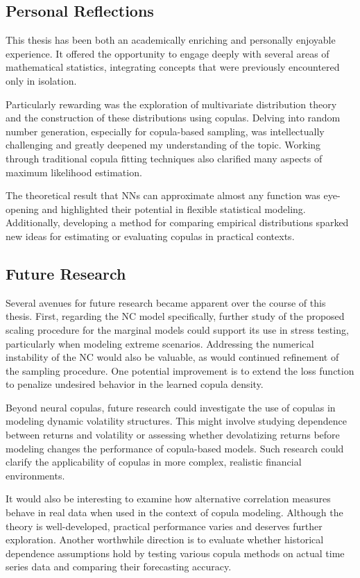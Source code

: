 \subsection{Personal Reflections}
This thesis has been both an academically enriching and personally enjoyable experience. It offered the opportunity to engage deeply with several areas of mathematical statistics, integrating concepts that were previously encountered only in isolation.

Particularly rewarding was the exploration of multivariate distribution theory and the construction of these distributions using copulas. Delving into random number generation, especially for copula-based sampling, was intellectually challenging and greatly deepened my understanding of the topic. Working through traditional copula fitting techniques also clarified many aspects of maximum likelihood estimation.

The theoretical result that \gls{NN}s can approximate almost any function was eye-opening and highlighted their potential in flexible statistical modeling. Additionally, developing a method for comparing empirical distributions sparked new ideas for estimating or evaluating copulas in practical contexts.

\subsection{Future Research}
Several avenues for future research became apparent over the course of this thesis. First, regarding the \gls{NC} model specifically, further study of the proposed scaling procedure for the marginal models could support its use in stress testing, particularly when modeling extreme scenarios. Addressing the numerical instability of the \gls{NC} would also be valuable, as would continued refinement of the sampling procedure. One potential improvement is to extend the loss function to penalize undesired behavior in the learned copula density.

Beyond neural copulas, future research could investigate the use of copulas in modeling dynamic volatility structures. This might involve studying dependence between returns and volatility or assessing whether devolatizing returns before modeling changes the performance of copula-based models. Such research could clarify the applicability of copulas in more complex, realistic financial environments.

It would also be interesting to examine how alternative correlation measures behave in real data when used in the context of copula modeling. Although the theory is well-developed, practical performance varies and deserves further exploration. Another worthwhile direction is to evaluate whether historical dependence assumptions hold by testing various copula methods on actual time series data and comparing their forecasting accuracy.

